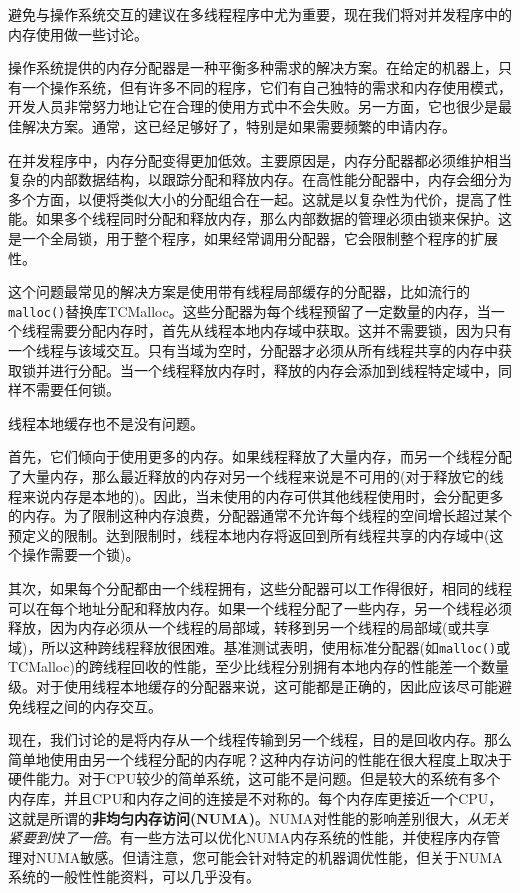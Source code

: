 避免与操作系统交互的建议在多线程程序中尤为重要，现在我们将对并发程序中的内存使用做一些讨论。


操作系统提供的内存分配器是一种平衡多种需求的解决方案。在给定的机器上，只有一个操作系统，但有许多不同的程序，它们有自己独特的需求和内存使用模式，开发人员非常努力地让它在合理的使用方式中不会失败。另一方面，它也很少是最佳解决方案。通常，这已经足够好了，特别是如果需要频繁的申请内存。

在并发程序中，内存分配变得更加低效。主要原因是，内存分配器都必须维护相当复杂的内部数据结构，以跟踪分配和释放内存。在高性能分配器中，内存会细分为多个方面，以便将类似大小的分配组合在一起。这就是以复杂性为代价，提高了性能。如果多个线程同时分配和释放内存，那么内部数据的管理必须由锁来保护。这是一个全局锁，用于整个程序，如果经常调用分配器，它会限制整个程序的扩展性。

这个问题最常见的解决方案是使用带有线程局部缓存的分配器，比如流行的\texttt{malloc()}替换库TCMalloc。这些分配器为每个线程预留了一定数量的内存，当一个线程需要分配内存时，首先从线程本地内存域中获取。这并不需要锁，因为只有一个线程与该域交互。只有当域为空时，分配器才必须从所有线程共享的内存中获取锁并进行分配。当一个线程释放内存时，释放的内存会添加到线程特定域中，同样不需要任何锁。

线程本地缓存也不是没有问题。

首先，它们倾向于使用更多的内存。如果线程释放了大量内存，而另一个线程分配了大量内存，那么最近释放的内存对另一个线程来说是不可用的(对于释放它的线程来说内存是本地的)。因此，当未使用的内存可供其他线程使用时，会分配更多的内存。为了限制这种内存浪费，分配器通常不允许每个线程的空间增长超过某个预定义的限制。达到限制时，线程本地内存将返回到所有线程共享的内存域中(这个操作需要一个锁)。

其次，如果每个分配都由一个线程拥有，这些分配器可以工作得很好，相同的线程可以在每个地址分配和释放内存。如果一个线程分配了一些内存，另一个线程必须释放，因为内存必须从一个线程的局部域，转移到另一个线程的局部域(或共享域)，所以这种跨线程释放很困难。基准测试表明，使用标准分配器(如\texttt{malloc()}或TCMalloc)的跨线程回收的性能，至少比线程分别拥有本地内存的性能差一个数量级。对于使用线程本地缓存的分配器来说，这可能都是正确的，因此应该尽可能避免线程之间的内存交互。

现在，我们讨论的是将内存从一个线程传输到另一个线程，目的是回收内存。那么简单地使用由另一个线程分配的内存呢？这种内存访问的性能在很大程度上取决于硬件能力。对于CPU较少的简单系统，这可能不是问题。但是较大的系统有多个内存库，并且CPU和内存之间的连接是不对称的。每个内存库更接近一个CPU，这就是所谓的\textbf{非均匀内存访问(NUMA)}。NUMA对性能的影响差别很大，\textit{从无关紧要到快了一倍}。有一些方法可以优化NUMA内存系统的性能，并使程序内存管理对NUMA敏感。但请注意，您可能会针对特定的机器调优性能，但关于NUMA系统的一般性性能资料，可以几乎没有。

